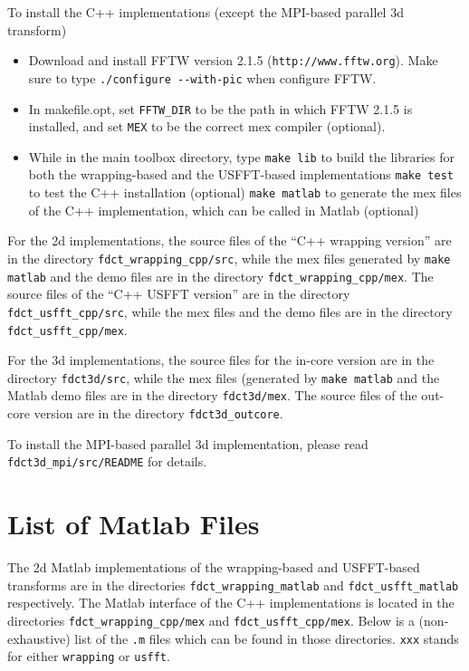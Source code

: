 \documentclass[11pt]{article}
\begin{document}
To install the C++ implementations (except the MPI-based parallel 3d
transform)
\begin{itemize}
\item
  Download and install FFTW version 2.1.5 (\verb=http://www.fftw.org=).
  Make sure to type \verb=./configure --with-pic= when configure FFTW.
\item
  In makefile.opt, \newline
  set \verb=FFTW_DIR= to be the path in which FFTW 2.1.5 is installed, and \newline
  set \verb=MEX= to be the correct mex compiler (optional).
\item
  While in the main toolbox directory, type \newline
  \verb=make lib= to build the libraries for both the wrapping-based and the USFFT-based implementations \newline
  \verb=make test= to test the C++ installation (optional) \newline
  \verb=make matlab= to generate the mex files of the C++ implementation, which can be called in Matlab (optional)
\end{itemize}

For the 2d implementations, the source files of the ``C++ wrapping
version'' are in the directory \verb=fdct_wrapping_cpp/src=, while the
mex files generated by \verb=make matlab= and the demo files are in
the directory \verb=fdct_wrapping_cpp/mex=. The source files of the
``C++ USFFT version'' are in the directory \verb=fdct_usfft_cpp/src=,
while the mex files and the demo files are in the directory
\verb=fdct_usfft_cpp/mex=.

For the 3d implementations, the source files for the in-core version
are in the directory \verb=fdct3d/src=, while the mex files (generated
by \verb=make matlab= and the Matlab demo files are in the
directory \verb=fdct3d/mex=. The source files of the out-core version
are in the directory \verb=fdct3d_outcore=.

To install the MPI-based parallel 3d implementation, please read
\verb=fdct3d_mpi/src/README= for details.

\section{List of Matlab Files}

The 2d Matlab implementations of the wrapping-based and USFFT-based
transforms are in the directories \verb=fdct_wrapping_matlab= and
\verb=fdct_usfft_matlab= respectively. The Matlab interface of the C++
implementations is located in the directories
\verb=fdct_wrapping_cpp/mex= and \verb=fdct_usfft_cpp/mex=. Below is a
(non-exhaustive) list of the \verb=.m= files which can be found in
those directories. \verb=xxx= stands for either \verb=wrapping= or
\verb=usfft=.
\end{document}
